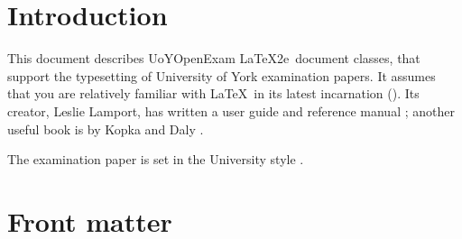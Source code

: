 \documentclass[fontsize=12, final]{UoYOpenExam}
\newcommand{\kwd}[1]{\textsf{#1}}
\begin{document}
\section{Introduction}
This document describes \kwd{UoYOpenExam} \LaTeX2e\ document classes, that support the
typesetting of University of York examination papers.  It assumes that
you are relatively familiar with \LaTeX\ in its latest incarnation
(\LaTeXe).  Its creator, Leslie Lamport, has written a user guide and
reference manual \cite{Lamport1994}; another useful book is by Kopka and
Daly \cite{KopkaDaly1999}. 

The examination paper is set in the University style
\cite{UoYStyleGuide}.

\section{Front matter}\label{Declarations:S}
\end{document}
